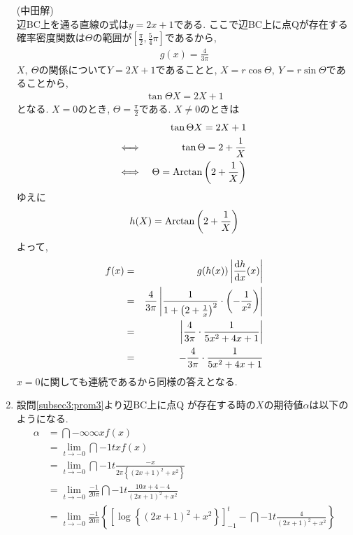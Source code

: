 \documentclass[dvipdfmx,titlepage, 11pt, a4paper]{jsarticle}%
\begin{document}
\begin{enumerate}[(1)]
  \noindent (中田解)\\
  辺BC上を通る直線の式は$y=2x+1$である. ここで辺BC上に点Qが存在する確率密度関数は$\Theta$の範囲が$\displaystyle \left[\frac{\pi}{2},\frac{5}{4}\pi\right]$であるから,
  \begin{eqnarray*}
    g(x) = \frac{4}{3\pi}
  \end{eqnarray*}
  $X,\ \Theta$の関係について$Y=2X+1$であることと, $X=r\cos \Theta,\ Y=r\sin \Theta$であることから,
  \begin{eqnarray*}
    \tan \Theta X = 2X+1
  \end{eqnarray*}
  となる. $X=0$のとき, $\displaystyle \Theta=\frac{\pi}{2}$である. $X\neq 0$のときは
  \begin{eqnarray*}
    &&\tan \Theta X = 2X+1\\
    \Longleftrightarrow\ &&\tan \Theta = 2+\frac{1}{X}\\
    \Longleftrightarrow\ &&\Theta = {\rm Arctan} \left(2+\frac{1}{X}\right)
  \end{eqnarray*}
  ゆえに
  \begin{eqnarray*}
    h(X) = {\rm Arctan} \left(2+\frac{1}{X}\right)
  \end{eqnarray*}
  よって,
  \begin{eqnarray*}
    f(x) &=& g(h(x))\left|\frac{{\rm d}h}{{\rm d}x}(x)\right|\\
         &=& \frac{4}{3\pi}\left|\frac{1}{1+\left(2+\frac{1}{x}\right)^{2}}\cdot \left(-\frac{1}{x^{2}}\right)\right|\\
         &=& \left|\frac{4}{3\pi}\cdot \frac{1}{5x^{2}+4x+1}\right|\\
         &=& -\frac{4}{3\pi}\cdot \frac{1}{5x^{2}+4x+1}
  \end{eqnarray*}
  $x=0$に関しても連続であるから同様の答えとなる. 
\item 設問\eqref{subsec3:prom3}より辺$\mathrm{BC}$上に点$\mathrm{Q}$
  が存在する時の$X$の期待値$\alpha$は以下のようになる.
  \begin{align*}
    \alpha &= \dint{-\infty}{\infty}{xf(x)}\\
           &= \lim_{t \to -0}\dint{-1}{t}{xf(x)}\\
           &= \lim_{t \to -0}\dint{-1}{t}{\frac{-x}{2\pi\left\{\left(2x + 1\right)^2 + x^2\right\}}}\\
           &= \lim_{t \to -0}\frac{-1}{20\pi}\dint{-1}{t}{\frac{10x + 4 - 4}{\left(2x + 1\right)^2 + x^2}}\\
           &= \lim_{t \to -0}\frac{-1}{20\pi}\left\{\left[\log\left\{\left(2x + 1\right)^2 + x^2\right\}\right]_{-1}^{t} - \dint{-1}{t}{\frac{4}{\left(2x + 1\right)^2 + x^2}}\right\}\\

\end{align*}
\end{enumerate}
\end{document}
